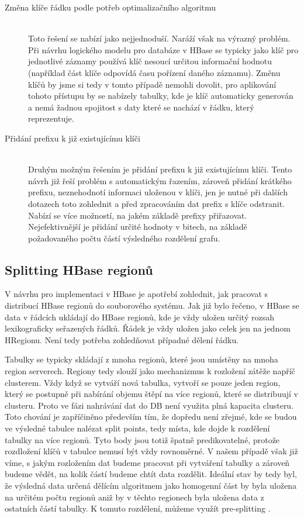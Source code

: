 \documentclass[thesis=M,czech]{FITthesis}[2012/06/26]
\begin{document}
\begin{description}
\item[Změna klíče řádku podle potřeb optimalizačního algoritmu] \hfill \\
 Toto řešení se nabízí jako nejjednoduší. Naráží však na výrazný problém. Při návrhu logického modelu pro databáze v HBase se typicky jako klíč pro jednotlivé záznamy používá klíč nesoucí určitou informační hodnotu (například část klíče odpovídá času pořízení daného záznamu). Změnu klíčů by jsme si tedy v tomto případě nemohli dovolit, pro aplikování tohoto přístupu by se nabízely tabulky, kde je klíč automaticky generován a nemá žadnou spojitost s daty které se nachází v řádku, který reprezentuje.
 
 \item[Přidání prefixu k již existujícímu klíči] \hfill \\
 Druhým možným řešením je přidání prefixu k již existujícímu klíči. Tento návrh již řeší problém s automatickým řazením, zároveň přidání krátkého prefixu, neznehodnotí informaci uloženou v klíči, jen je nutné při dalších dotazech toto zohlednit a před zpracováním dat prefix s klíče odstranit. Nabízí se více možností, na jakém základě prefixy přiřazovat. Nejefektivnější je přidání určité hodnoty v bitech, na základě požadovaného počtu částí výsledného rozdělení grafu.
 
\end{description} 

\subsection{Splitting HBase regionů}
V návrhu pro implementaci v HBase je apotřebí zohlednit, jak pracovat s distribucí HBase regionů do souborového systému. Jak již bylo řečeno, v HBase se data v řádcích ukládají do HBase regionů, kde je vždy uložen určitý rozsah lexikograficky seřazených řádků. Řádek je vždy uložen jako celek jen na jednom HRegionu. Není tedy potřeba zohledňovat případné dělení řádku. 

Tabulky se typicky skládají z mnoha regionů, které jsou umístěny na mnoha region serverech. Regiony tedy slouží jako mechanizmus k rozložení zátěže napříč clusterem. Vždy když se vytváří nová tabulka, vytvoří se pouze jeden region, který se postupně při nabírání objemu štěpí na více regionů, které se distribuují v clusteru. Proto ve fázi nahrávání dat do DB není využita plná kapacita clusteru. Toto chování je zapříčiněno především tím, že dopředu není zřejmé, kde se budou ve výsledné tabulce nalézat split points, tedy místa, kde dojde k rozdělení tabulky na více regionů. Tyto body jsou totiž špatně predikovatelné, protože rozdložení klíčů v tabulce nemusí být vždy rovnoměrné. V našem případě však již víme, s jakým rozložením dat budeme pracovat při vytváření tabulky a zároveň budeme vědět, na kolik částí budeme chtít data rozdělit. Ideální stav by tedy byl, že výsledná data určená dělícím algoritmem jako homogenní část by byla uložena na určitém počtu regionů aniž by v těchto regionech byla uložena data z ostatních částí tabulky. K tomuto rozdělení, můžeme využít pre-splitting \cite{split}.
\end{document}
